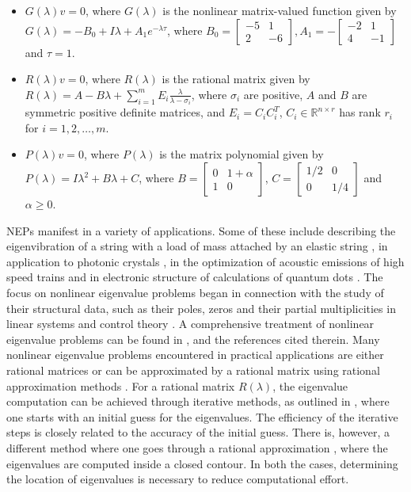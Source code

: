 \documentclass[12pt, reqno]{amsart}
\theoremstyle{definition}
\theoremstyle{remark}
\numberwithin{equation}{section}
\begin{document}
\begin{itemize}
\item[(i)] $G(\lambda)v= 0$, where $G(\lambda)$ is the nonlinear matrix-valued 
function given by $ G(\lambda) = -B_0 + I \lambda + A_1 e ^ {-\lambda \tau}$, 
where $B_0 = \begin{bmatrix}
-5 & 1 \\
2 & -6
\end{bmatrix}, A_1 = -\begin{bmatrix}
-2 & 1 \\
4 & -1
\end{bmatrix}$ and $\tau = 1$.
\item[(ii)] $R(\lambda)v=0$, where $R(\lambda)$ is the rational matrix given by 
$R(\lambda) = A-B\lambda + \displaystyle \sum_{i = 1}^{m} E_i \frac{\lambda}{\lambda-\sigma_i}$, 
where $\sigma_i$ are positive, $A $ and $B$ are symmetric positive definite 
matrices, and $E_i= C_iC_i^T$, $C_i \in \mathbb{R}^{n\times r}$ has rank $r_i$ 
for $ i=1,2,\ldots,m$.
\item[(iii)] $P(\lambda)v=0$, where $P(\lambda)$ is the matrix polynomial given 
by $P(\lambda) = I \lambda^2 +B \lambda +C$, where $B = \begin{bmatrix}
0 & 1+\alpha \\
1 & 0
\end{bmatrix}$, $C = \begin{bmatrix}
1/2 & 0\\
0 & 1/4
\end{bmatrix}$ and $\alpha \geq 0$.
\end{itemize} 
NEPs manifest in a variety of applications. Some of these include describing 
the eigenvibration of a string with a load of mass attached by an elastic string 
\cite{Betcke-Higham-Tisseur}, in application to photonic crystals 
\cite{Engstrom-Langer-Tretter}, in the optimization of acoustic emissions of high 
speed trains \cite{Mackey} and in electronic structure of calculations of quantum 
dots \cite{Heinrich}. The focus on nonlinear eigenvalue problems began in connection 
with the study of their structural data, such as their poles, zeros and their 
partial multiplicities in linear systems and control theory \cite{Kailath}. 
A comprehensive treatment of nonlinear eigenvalue problems can be found in 
\cite{Dopico}, \cite{Mehrmann-Voss} 
and the references cited therein. Many nonlinear eigenvalue problems encountered 
in practical applications are either rational matrices or can be approximated by 
a rational matrix using rational approximation methods \cite{Saad-Guide-Meidlar}. 
For a rational matrix $R(\lambda)$, the eigenvalue computation can be achieved 
through iterative methods, as outlined in \cite{Mehrmann-Voss}, where one starts 
with an initial guess for the eigenvalues. The efficiency of the iterative steps 
is closely related to the accuracy of the initial guess. There is, however, a 
different method where one goes through a rational approximation 
\cite{Saad-Guide-Meidlar} , where the eigenvalues are computed inside a closed 
contour. In both the cases, determining the location of eigenvalues is 
necessary to reduce computational effort.
\end{document}
